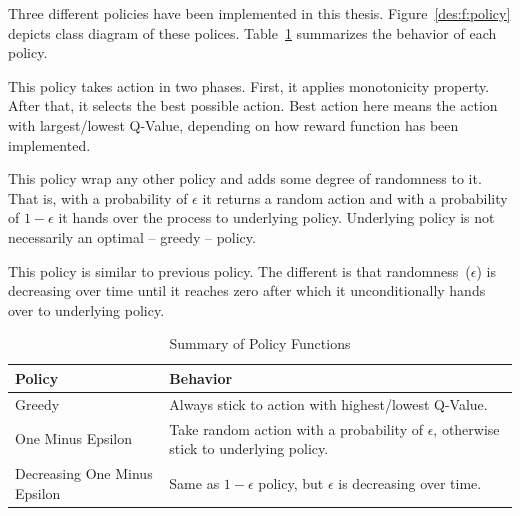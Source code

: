 Three different policies have been implemented in this thesis. Figure~\ref{des:f:policy} depicts class diagram of these polices. Table~\ref{des:tab:policy} summarizes the behavior of each policy.
\begin{description}[leftmargin=0pt]
    \item[Greedy Policy] This policy takes action in two phases. First, it applies monotonicity property. After that, it selects the best possible action. Best action here means the action with largest/lowest Q-Value, depending on how reward function has been implemented.
    \item[One Minus Epsilon Policy] This policy wrap any other policy and adds some degree of randomness to it. That is, with a probability of $\epsilon$ it returns a random action and with a probability of $1-\epsilon$ it hands over the process to underlying policy. Underlying policy is not necessarily an optimal -- greedy -- policy.
    \item[Decreasing One Minus Epsilon Policy] This policy is similar to previous policy. The different is that randomness~($\epsilon$) is decreasing over time until it reaches zero after which it unconditionally hands over to underlying policy.
\end{description}
\begin{table}[h]
    \begin{tabular}{ll}
        \toprule
        \textbf{Policy} & \textbf{Behavior}\\
        \midrule
        Greedy & Always stick to action with highest/lowest Q-Value.\\
        One Minus Epsilon & Take random action with a probability of $\epsilon$, otherwise stick to underlying policy. \\
        Decreasing One Minus Epsilon & Same as $1-\epsilon$ policy, but $\epsilon$ is decreasing over time.\\
        \bottomrule
    \end{tabular}
    \centering
    \caption{Summary of Policy Functions}
    \label{des:tab:policy}
\end{table}

